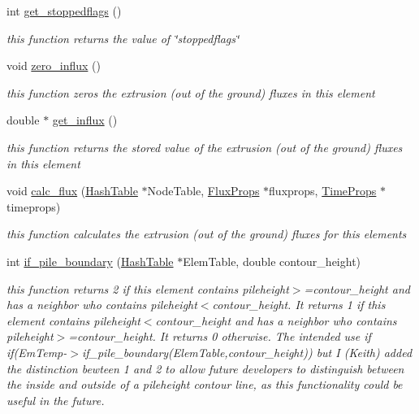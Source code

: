 \begin{CompactItemize}
int \hyperlink{classElement_a107}{get\_\-stoppedflags} ()
\begin{CompactList}\small\item\em this function returns the value of \char`\"{}stoppedflags\char`\"{} \item\end{CompactList}\item 
void \hyperlink{classElement_a108}{zero\_\-influx} ()
\begin{CompactList}\small\item\em this function zeros the extrusion (out of the ground) fluxes in this element \item\end{CompactList}\item 
double $\ast$ \hyperlink{classElement_a109}{get\_\-influx} ()
\begin{CompactList}\small\item\em this function returns the stored value of the extrusion (out of the ground) fluxes in this element \item\end{CompactList}\item 
void \hyperlink{classElement_a110}{calc\_\-flux} (\hyperlink{classHashTable}{Hash\-Table} $\ast$Node\-Table, \hyperlink{structFluxProps}{Flux\-Props} $\ast$fluxprops, \hyperlink{structTimeProps}{Time\-Props} $\ast$timeprops)
\begin{CompactList}\small\item\em this function calculates the extrusion (out of the ground) fluxes for this elements \item\end{CompactList}\item 
int \hyperlink{classElement_a111}{if\_\-pile\_\-boundary} (\hyperlink{classHashTable}{Hash\-Table} $\ast$Elem\-Table, double contour\_\-height)
\begin{CompactList}\small\item\em this function returns 2 if this element contains pileheight$>$=contour\_\-height and has a neighbor who contains pileheight$<$contour\_\-height. It returns 1 if this element contains pileheight$<$contour\_\-height and has a neighbor who contains pileheight$>$=contour\_\-height. It returns 0 otherwise. The intended use if if(Em\-Temp-$>$if\_\-pile\_\-boundary(Elem\-Table,contour\_\-height)) but I (Keith) added the distinction bewteen 1 and 2 to allow future developers to distinguish between the inside and outside of a pileheight contour line, as this functionality could be useful in the future. \item\end{CompactList}\item 

\end{CompactItemize}

